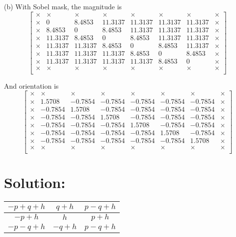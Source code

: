 \documentclass[12pt]{article}
\begin{document}
(b) With Sobel mask, the magnitude is 
\begin{equation*}
\left[ \begin{array}{cccccccc}
\times & \times & \times & \times & \times & \times &\times & \times\\
\times& 0 & 8.4853 & 11.3137 & 11.3137 & 11.3137 & 11.3137 & \times\\
\times & 8.4853 & 0 & 8.4853 & 11.3137 & 11.3137 & 11.3137 & \times\\
\times & 11.3137 & 8.4853 & 0 & 8.4853 & 11.3137 & 11.3137 & \times\\
\times & 11.3137 & 11.3137 & 8.4853 & 0 & 8.4853 & 11.3137 & \times\\
\times& 11.3137 & 11.3137 & 11.3137 & 8.4853 & 0 & 8.4853 & \times\\
\times& 11.3137 & 11.3137 & 11.3137 & 11.3137 & 8.4853 & 0 & \times\\
\times & \times & \times & \times & \times & \times &\times & \times\\
\end{array} \right]
\end{equation*}

And orientation is
\begin{equation*}
\left[ \begin{array}{cccccccc}
\times & \times & \times & \times & \times & \times &\times & \times\\
\times & 1.5708 & -0.7854 & -0.7854 & -0.7854 & -0.7854 & -0.7854 & \times\\
\times & -0.7854 & 1.5708 & -0.7854 & -0.7854 & -0.7854 & -0.7854 & \times\\
\times & -0.7854 & -0.7854 & 1.5708 & -0.7854 & -0.7854 & -0.7854 & \times\\
\times & -0.7854 & -0.7854 & -0.7854 & 1.5708 & -0.7854 & -0.7854 & \times\\
\times & -0.7854 & -0.7854 & -0.7854 & -0.7854 & 1.5708 & -0.7854 & \times\\
\times & -0.7854 & -0.7854 & -0.7854 & -0.7854 & -0.7854 & 1.5708 & \times\\
\times & \times & \times & \times & \times & \times &\times & \times\\
\end{array} \right]
\end{equation*}

\section{Solution:}
\begin{table*}[h]
\centering
\begin{tabular}{|c|c|c|}
\hline
$-p+q+h$ & $q+h$ & $p-q+h$\\
\hline
$-p+h$ & $h$ & $p+h$\\
\hline
$-p-q+h$& $-q+h$ & $p-q+h$\\
\hline
\end{tabular}
\end{table*}
\end{document}
